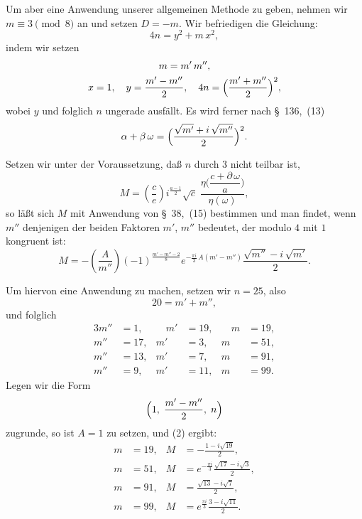 \documentclass[12pt,a4paper]{article}
\theoremstyle{definition}
\begin{document}
Um aber eine Anwendung unserer allgemeinen Methode zu geben, nehmen wir 
$m \equiv 3 \pmod 8$ an und setzen $D = -m$. Wir befriedigen die Gleichung:
\[
4n = y^{2} + m\,x^{2},
\]
indem wir setzen
\begin{gather*}
m = m'\, m'',\\
x = 1,\quad y = \frac{m' - m''}{2},\quad 4n = \Bigl(\frac{m' + m''}{2}\Bigr)^{2},
\end{gather*}
wobei $y$ und folglich $n$ ungerade ausfällt. Es wird ferner nach 
\S~136,~(13)
\[
\alpha + \beta\,\omega = \Bigl(\frac{\sqrt{m'} + i\,\sqrt{m''}}{2}\Bigr)^{2}.
\]

Setzen wir unter der Voraussetzung, daß $n$ durch $3$ nicht teilbar ist,
\begin{equation}
M = \left(\frac{c}{e}\right) i^{\frac{a-1}{2}} \sqrt{c}\;
\frac{\eta\bigl(\dfrac{c + \partial\,\omega}{a}\bigr)}{\eta(\omega)},
\end{equation}
so läßt sich $M$ mit Anwendung von \S~38,~(15) bestimmen und man findet, 
wenn $m''$ denjenigen der beiden Faktoren $m'$, $m''$ bedeutet, der modulo 
$4$ mit $1$ kongruent ist:
\begin{equation}
M = -\left(\frac{A}{m''}\right) (-1)^{\frac{m' - m'' - 2}{8}}
e^{-\frac{\pi i}{3}\,A(m' - m'')} \frac{\sqrt{m''} - i\,\sqrt{m'}}{2}.
\end{equation}

Um hiervon eine Anwendung zu machen, setzen wir $n = 25$, also
\[
20 = m' + m'',
\]
und folglich
\begin{alignat*}{3}
m'' &= 1, &\quad m' &= 19, &\quad m &= 19,\\
m'' &= 17, & m' &= 3, & m &= 51,\\
m'' &= 13, & m' &= 7, & m &= 91,\\
m'' &= 9, & m' &= 11, & m &= 99.
\end{alignat*}
Legen wir die Form
\[
\Bigl(1,\; \frac{m' - m''}{2},\; n\Bigr)
\]
zugrunde, so ist $A = 1$ zu setzen, und (2) ergibt:
\begin{equation}
\begin{aligned}
m &= 19, & M &= -\frac{1 - i\sqrt{19}}{2},\\
m &= 51, & M &= e^{-\frac{\pi i}{3}} \frac{\sqrt{17} - i\sqrt{3}}{2},\\
m &= 91, & M &= \frac{\sqrt{13} - i\sqrt{7}}{2},\\
m &= 99, & M &= e^{\frac{\pi i}{3}} \frac{3 - i\sqrt{11}}{2}.
\end{aligned}
\end{equation}
\end{document}

